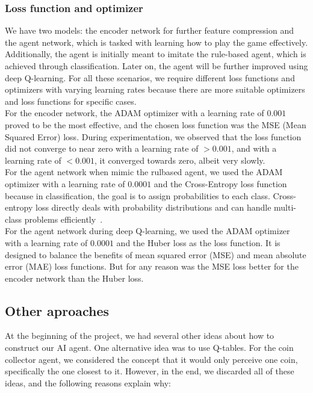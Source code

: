 \subsubsection{Loss function and optimizer}

We have two models: the encoder network for further feature compression and the agent network, which is tasked with 
learning how to play the game effectively. Additionally, the agent is initially meant to imitate the rule-based agent, which is 
achieved through classification. Later on, the agent will be further improved using deep Q-learning. For all these scenarios, we require 
different loss functions and optimizers with varying learning rates because there are more suitable optimizers and loss functions for specific cases.\\

For the encoder network, the ADAM optimizer with a learning rate of $0.001$ proved to be the most effective, and the chosen loss 
function was the MSE (Mean Squared Error) loss. During experimentation, we observed that the loss function did not converge to near 
zero with a learning rate of $>0.001$, and with a learning rate of $<0.001$, it converged towards zero, albeit very slowly. \\

For the agent network when mimic the rulbased agent, we used the ADAM optimizer with a learning rate of $0.0001$ and the Cross-Entropy loss function because
in classification, the goal is to assign probabilities to each class. Cross-entropy loss directly deals with probability 
distributions and can handle multi-class problems efficiently~\cite{Onl:crossentr}.\\

For the agent network during deep Q-learning, we used the ADAM optimizer with a learning rate of $0.0001$ and the Huber loss as the loss function.
It is designed to balance the benefits of mean squared error (MSE) and mean absolute error (MAE) loss functions.
But for any reason was the MSE loss better for the encoder network than the Huber loss.

\subsection{Other aproaches}

At the beginning of the project, we had several other ideas about how to construct our AI agent. One alternative idea was to use Q-tables. 
For the coin collector agent, we considered the concept that it would only perceive one coin, specifically the one closest to it.
However, in the end, we discarded all of these ideas, and the following reasons explain why:

